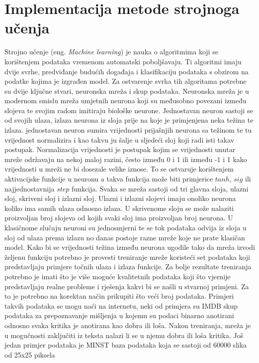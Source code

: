 \documentclass[times, utf8, diplomski]{fer}
\begin{document}
\chapter{Implementacija metode strojnoga učenja}
Strojno učenje (eng. \textit{Machine learning}) je nauka o algoritmima koji se korištenjem podataka vremenom
automatski poboljšavaju. Ti algoritmi imaju dvije svrhe, predviđanje budućih događaja i klasifikaciju podataka
s obzirom na podatke kojima je izgrađen model. Za ostvarenje svrha tih algoritama potrebne su dvije ključne
stvari, neuronska mreža i skup podataka. Neuronska mreža je u modernom smislu mreža umjetnih neurona koji su
međusobno povezani između slojeva te svojim radom imitiraju biološke neurone. Jednostavan neuron sastoji se
od svojih ulaza, izlaza neurona iz sloja prije na koje je primjenjena neka težina te izlaza. jednostavan
neuron sumira vrijednosti prijašnjih neurona sa težinom te tu vrijednost normalizira i kao takvu ju šalje
u sljedeći sloj koji radi isti takav postupak. Normalizacija vrijednosti je postupak kojim se vrijednosti
unutar mreže održavaju na nekoj maloj razini, često između 0 i 1 ili između -1 i 1 kako vrijednosti u mreži
ne bi dosezale velike iznose. To se ostvaruje korištenjem aktivacijske funkcije u neuronu a takva funkcija može
biti primjerice $tanh$, $sig$ ili najjednostavnija $step$ funkcija. Svaka se mreža sastoji od tri glavna sloja,
ulazni sloj, skriveni sloj i izlazni sloj. Ulazni i izlazni slojevi imaju onoliko neurona koliko ima samih
ulaza odnosno izlaza. U skrivenome sloju se može nalaziti proizvoljan broj slojeva od kojih svaki sloj ima
proizvoljan broj neurona. U klasičnome slučaju neuroni su jednosmjerni te se tok podataka odvija iz sloja u
sloj od ulaza prema izlazu no danas postoje razne mreže koje ne prate klasičan model. Kako bi se vrijednosti
težina između neurona ugodile tako da mreža izvodi željenu funkciju potrebno je provesti treniranje mreže
koristeći set podataka koji predstavljaju primjere točnih ulaza i izlaza funkcije. Za bolje rezultate treniranja
potrebno je imati što je više moguće kvalitetnih podataka koji što vjernije predstavljaju realne probleme i
rješenja kakvi bi se našli u stvarnoj primjeni. Za to je potrebno na korektan način prikupiti što veći broj
podataka. Primjeri takvih podataka se mogu naći na internetu, neki od primjera su IMDB skup podataka za 
prepoznavanje mišljenja u kojemu su podaci binarno anotirani odnosno svaka kritika je anotirana kao dobra ili
loša. Nakon treniranja, mreža je u mogučnosti zaključiti iz teksta nalazi li se u njemu dobra ili loša kritika.
Još jedan primjer podataka je MINST baza podataka koja se sastoji od 60000 slika od 25x25 piksela
\end{document}
